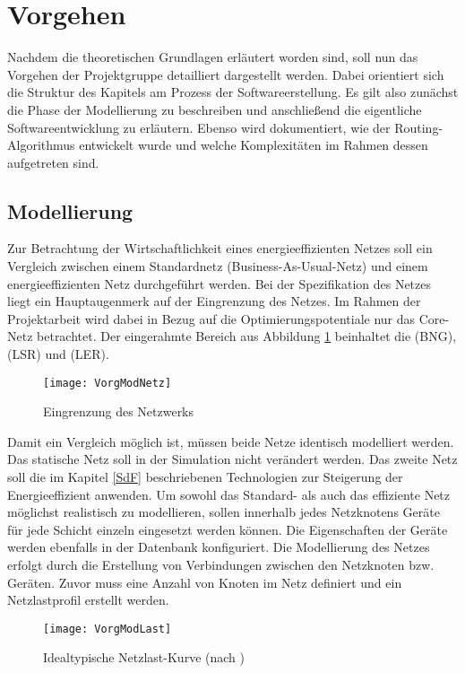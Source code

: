 \section{Vorgehen}
Nachdem die theoretischen Grundlagen erläutert worden sind, soll nun das Vorgehen der Projektgruppe detailliert dargestellt werden. Dabei orientiert sich die Struktur des Kapitels am Prozess der Softwareerstellung. Es gilt also zunächst die Phase der Modellierung zu beschreiben und anschließend die eigentliche Softwareentwicklung zu erläutern. Ebenso wird dokumentiert, wie der Routing-Algorithmus entwickelt wurde und welche Komplexitäten im Rahmen dessen aufgetreten sind.

\subsection{Modellierung}
Zur Betrachtung der Wirtschaftlichkeit eines energieeffizienten Netzes soll ein Vergleich zwischen einem Standardnetz (Business-As-Usual-Netz) und einem energieeffizienten Netz durchgeführt werden. Bei der Spezifikation des Netzes liegt ein Hauptaugenmerk auf der Eingrenzung des Netzes. Im Rahmen der Projektarbeit wird dabei in Bezug auf die Optimierungspotentiale nur das Core-Netz betrachtet. Der eingerahmte Bereich aus Abbildung \ref{fig:VorgModNetz} beinhaltet die  (BNG),  (LSR) und  (LER).


\begin{figure}[htb]
	\centering
	\texttt{[image: VorgModNetz]}
	\caption{Eingrenzung des Netzwerks} 
	\label{fig:VorgModNetz}
\end{figure}


Damit ein Vergleich möglich ist, müssen beide Netze identisch modelliert werden. Das statische Netz soll in der Simulation nicht  verändert werden. Das zweite Netz soll die im Kapitel \ref{SdF} beschriebenen Technologien zur Steigerung der Energieeffizient anwenden. Um sowohl das Standard- als auch das effiziente Netz möglichst realistisch zu modellieren, sollen innerhalb jedes Netzknotens Geräte für jede Schicht einzeln eingesetzt werden können. Die Eigenschaften der Geräte werden ebenfalls in der Datenbank konfiguriert.  Die Modellierung des Netzes erfolgt durch die Erstellung von Verbindungen zwischen den Netzknoten bzw. Geräten. Zuvor muss eine Anzahl von Knoten im Netz definiert und ein Netzlastprofil erstellt werden.

\begin{figure}[htb]
	\centering
	\texttt{[image: VorgModLast]}
	\caption{Idealtypische Netzlast-Kurve (nach \cite[3]{Chiaraviglio2009})} 
	\label{fig:VorgModLast}
\end{figure}

